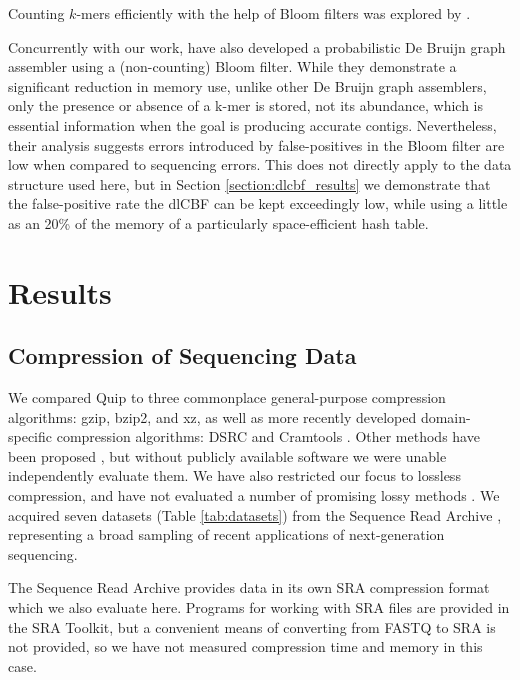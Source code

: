 \documentclass[twocolumn]{article}
\begin{document}
Counting $k$-mers efficiently with the help of Bloom filters was explored by
\citet{Melsted2011}.

Concurrently with our work, \citet{Pell2011} have also developed a
probabilistic De Bruijn graph assembler using a (non-counting) Bloom filter.
While they demonstrate a significant reduction in memory use, unlike other De
Bruijn graph assemblers, only the presence or absence of a k-mer is stored,
not its abundance, which is essential information when the goal is producing
accurate contigs. Nevertheless, their analysis suggests errors introduced by
false-positives in the Bloom filter are low when compared to sequencing
errors. This does not directly apply to the data structure used here, but in
Section \ref{section:dlcbf_results} we demonstrate that the false-positive
rate the dlCBF can be kept exceedingly low, while using a little as an 20\% of
the memory of a particularly space-efficient hash table.



\section{Results}
\label{section:results}

\subsection{Compression of Sequencing Data}


We compared Quip to three commonplace general-purpose compression algorithms:
gzip, bzip2, and xz, as well as more recently developed domain-specific
compression algorithms: DSRC \citep{Deorowicz2011} and Cramtools \citep{Hsi-
YangFritz2011}. Other methods have been proposed \citep{Tembe2010,
Kozanitis2011, Bhola2011, Sakib2011}, but without publicly available software
we were unable independently evaluate them. We have also restricted our focus
to lossless compression, and have not evaluated a number of promising lossy
methods \citep{Hsi-YangFritz2011,Wan2011,Hach2012}. We acquired seven datasets
(Table \ref{tab:datasets}) from the Sequence Read Archive
\citep{Leinonen2011}, representing a broad sampling of recent applications of
next-generation sequencing.

The Sequence Read Archive provides data in its own SRA compression format
which we also evaluate here. Programs for working with SRA files are provided
in the SRA Toolkit, but a convenient means of converting from FASTQ to SRA is
not provided, so we have not measured compression time and memory in this
case.
\end{document}
